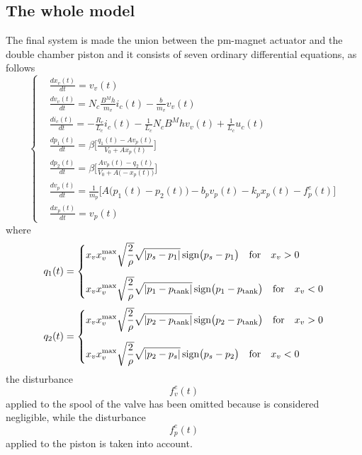 \documentclass[12pt,a4paper,oneside]{book}
\begin{document}
\begin{onehalfspace}
\subsection{The whole model}
The final system is made the union between the pm-magnet actuator and the double chamber piston and it consists of seven ordinary differential equations, as follows
\begin{equation}\label{linact_10}
	\left\lbrace \begin{aligned}
		&\frac{dx_v(t)}{dt} = v_v(t) \\[6pt]
		&\frac{dv_v(t)}{dt} = N_c\frac{B^Mh}{m_v} i_c(t)-\frac{b}{m_v} v_v(t) \\[6pt]
		&\frac{di_c(t)}{dt} = -\frac{R_c}{L_c}i_c(t)-\frac{1}{L_c}N_cB^Mhv_v(t)+\frac{1}{L_c}u_c(t)\\[6pt]
		&\frac{dp_1(t)}{dt} = \beta\Bigg[\frac{q_1(t)-Av_p(t)}{V_0+Ax_p(t)}\Bigg]  \\[6pt]
		&\frac{dp_2(t)}{dt} = \beta\Bigg[\frac{Av_p(t) - q_2(t)}{V_0+A\big(-x_p(t)\big)}\Bigg] \\[6pt]
		&\frac{dv_p(t)}{dt} = \frac{1}{m_p}\Bigg[A\Big(p_1(t)-p_2(t)\Big)-b_pv_p(t)-k_px_p(t)-f^e_p(t)\Bigg] \\[6pt]
		&\frac{dx_p(t)}{dt} = v_p(t)
	\end{aligned}\right. 
\end{equation}
where 
\begin{equation}\label{}
	q_1(t) = \left\lbrace \begin{aligned}
		&x_vx_v^{\text{max}}\sqrt{\frac{2}{\rho}}\sqrt{|p_{s}-p_1|}\,\text{sign}\big(p_{s}-p_1\big) \quad \text{for} \quad x_v > 0 \\[6pt]
		&x_vx_v^{\text{max}}\sqrt{\frac{2}{\rho}}\sqrt{|p_{1}-p_\text{tank}|}\,\text{sign}\big(p_{1}-p_\text{tank}\big) \quad \text{for} \quad x_v < 0
	\end{aligned}\right. 
\end{equation}
\begin{equation}\label{}
	q_2(t) = \left\lbrace \begin{aligned}
		&x_vx_v^{\text{max}}\sqrt{\frac{2}{\rho}}\sqrt{|p_{2}-p_\text{tank}|}\,\text{sign}\big(p_{2}-p_\text{tank}\big) \quad \text{for} \quad x_v > 0 \\[6pt]
		&x_vx_v^{\text{max}}\sqrt{\frac{2}{\rho}}\sqrt{|p_{2}-p_s|}\,\text{sign}\big(p_{s}-p_2\big) \quad \text{for} \quad x_v < 0
	\end{aligned}\right. 
\end{equation}
the disturbance $$f^e_v(t)$$ applied to the spool of the valve has been omitted because is considered negligible, while the disturbance $$f^e_p(t)$$ applied to the piston is taken into account.


\end{onehalfspace}
\end{document}

